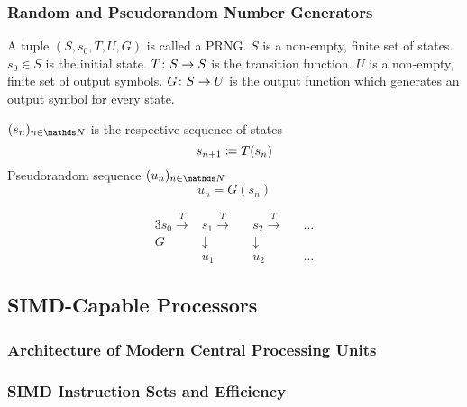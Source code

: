 \documentclass{stdlocal}
\begin{document}
    \subsubsection*{Random and Pseudorandom Number Generators} %
    \label{ssub:random_and_pseudorandom_number_generators}
      \begin{definition}
        A tuple $(S,s_0,T,U,G)$ is called a PRNG.
        $S$ is a non-empty, finite set of states.
        $s_0 \in S$ is the initial state.
        $T\colon S\to S$ is the transition function.
        $U$ is a non-empty, finite set of output symbols.
        $G\colon S\to U$ is the output function which generates an output symbol for every state.
      \end{definition}

      \begin{definition}
        $(s_n)_{n\in\setNatural}$ is the respective sequence of states
        \[
          s_{n+1} \coloneqq T(s_n)
        \]
        Pseudorandom sequence $(u_n)_{n\in\setNatural}$
        \[
          u_n = G(s_n)
        \]
      \end{definition}

      \begin{alignat*}{3}
        s_0 \xrightarrow{T} &s_1 \xrightarrow{T} &&s_2 \xrightarrow{T} &&\ldots \\
        G &\downarrow &&\downarrow \\
        &u_1 &&u_2 &&\ldots
      \end{alignat*}

  \subsection{SIMD-Capable Processors} %
  \label{sub:simd-capable_processors}
    \subsubsection*{Architecture of Modern Central Processing Units} %
    \label{ssub:architecture_of_modern_central_processing_units}


    \subsubsection*{SIMD Instruction Sets and Efficiency} %
    \label{ssub:simd_instruction_sets_and_efficiency}
\end{document}
